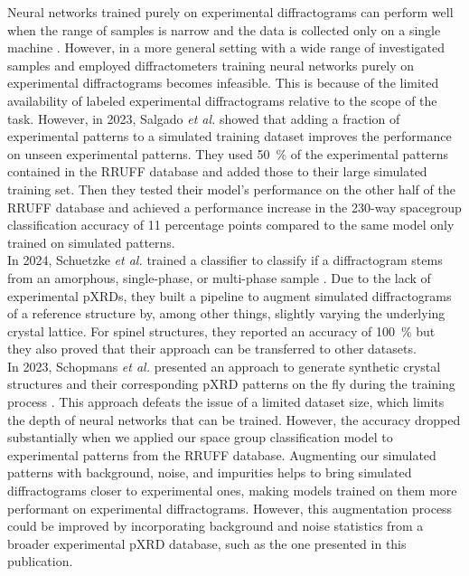 Neural networks trained purely on experimental diffractograms can perform well when the range of samples is narrow and the data is collected only on a single machine \cite{Lee2023, hattrick-simpers2021}. However, in a more general setting with a wide range of investigated samples and employed diffractometers training neural networks purely on experimental diffractograms becomes infeasible. This is because of the limited availability of labeled experimental diffractograms relative to the scope of the task. However, in 2023, Salgado {\it et al.} \cite{Salgado2023} showed that adding a fraction of experimental patterns to a simulated training dataset improves the performance on unseen experimental patterns. They used \SI{50}{\percent} of the experimental patterns contained in the RRUFF database and added those to their large simulated training set. Then they tested their model's performance on the other half of the RRUFF database and achieved a performance increase in the 230-way spacegroup classification accuracy of \num{11} percentage points compared to the same model only trained on simulated patterns. \\

In 2024, Schuetzke {\it et al.} trained a classifier to classify if a diffractogram stems from an amorphous, single-phase, or multi-phase sample \cite{Schuetzke2024}. Due to the lack of experimental pXRDs, they built a pipeline to augment simulated diffractograms of a reference structure by, among other things, slightly varying the underlying crystal lattice. For spinel structures, they reported an accuracy of \SI{100}{\percent} but they also proved that their approach can be transferred to other datasets.\\

In 2023, Schopmans {\it et al.} presented an approach to generate synthetic crystal structures and their corresponding pXRD patterns on the fly during the training process \cite{Schopmans2023}. This approach defeats the issue of a limited dataset size, which limits the depth of neural networks that can be trained. However, the accuracy dropped substantially when we applied our space group classification model to experimental patterns from the RRUFF database. Augmenting our simulated patterns with background, noise, and impurities helps to bring simulated diffractograms closer to experimental ones, making models trained on them more performant on experimental diffractograms. However, this augmentation process could be improved by incorporating background and noise statistics from a broader experimental pXRD database, such as the one presented in this publication.\\

